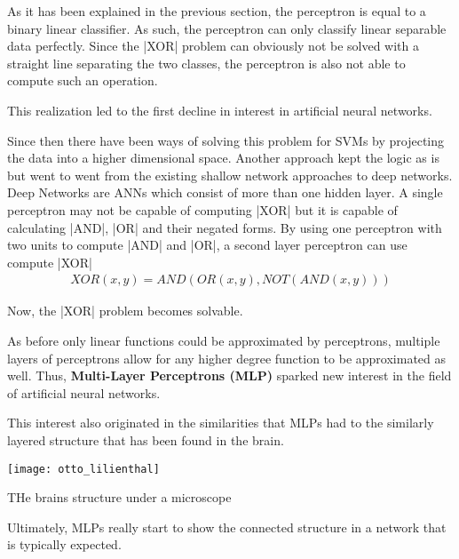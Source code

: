 As it has been explained in the previous section, the perceptron is equal to a binary linear classifier.
As such, the perceptron can only classify linear separable data perfectly.
Since the |XOR| problem can obviously not be solved with a straight line separating the two classes, the perceptron is also not able to compute such an operation. 

This realization led to the first decline in interest in artificial neural networks.

Since then there have been ways of solving this problem for SVMs by projecting the data into a higher dimensional space.
Another approach kept the logic as is but went to went from the existing shallow network approaches to deep networks.
Deep Networks are ANNs which consist of more than one hidden layer.
A single perceptron may not be capable of computing |XOR| but it is capable of calculating |AND|, |OR| and their negated forms.
By using one perceptron with two units to compute |AND| and |OR|, a second layer perceptron can use compute |XOR|
\begin{align}
    XOR(x, y) = AND(OR(x, y), NOT(AND(x, y)))
\end{align}

Now, the |XOR| problem becomes solvable.


As before only linear functions could be approximated by perceptrons, multiple layers of perceptrons allow for any higher degree function to be approximated as well.
Thus, \textbf{Multi-Layer Perceptrons (MLP)} sparked new interest in the field of artificial neural networks.

This interest also originated in the similarities that MLPs had to the similarly layered structure that has been found in the brain.
\begin{marginfigure}
    \texttt{[image: otto\_lilienthal]}
    \caption[]{THe brains structure under a microscope}
\end{marginfigure}
Ultimately, MLPs really start to show the connected structure in a network that is typically expected.




